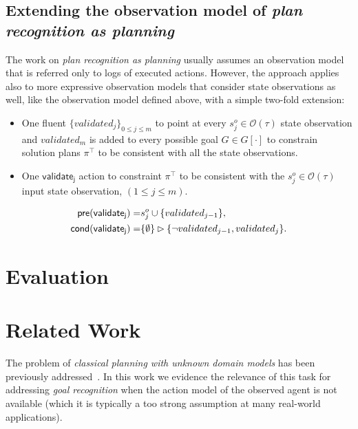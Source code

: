 \documentclass{article}
\newcommand{\pre}{\mathsf{pre}}     %
\newcommand{\cond}{\mathsf{cond}}   %
\begin{document}
\subsection{Extending the observation model of {\em plan recognition as planning}}
The work on {\em plan recognition as planning} usually assumes an observation model that is referred only to logs of executed actions. However, the approach applies also to more expressive observation models that consider state observations as well, like the observation model defined above, with a simple two-fold extension:
\begin{itemize}
\item One fluent $\{validated_j\}_{0\leq j\leq m}$ to point at every $s_j^o\in\mathcal{O}(\tau)$ state observation and $validated_m$ is added to every possible goal $G\in G[\cdot]$ to constrain solution plans $\pi^\top$ to be consistent with all the state observations.
\item One $\mathsf{validate_{j}}$ action to constraint $\pi^\top$ to be consistent with the $s_j^o\in\mathcal{O}(\tau)$ input state observation, {\small $(1\leq j\leq m)$}.  
\end{itemize}
\begin{small}
\begin{align*}
\hspace*{7pt}\pre(\mathsf{validate_{j}})=&s_j^o\cup\{validated_{j-1}\},\\
\cond(\mathsf{validate_{j}})=&\{\emptyset\}\rhd\{\neg validated_{j-1}, validated_j\}.
\end{align*}
\end{small}



\section{Evaluation}
\label{sec:evaluation}

\section{Related Work}
\label{sec:evaluation}
The problem of {\em classical planning with unknown domain models} has been previously addressed~\cite{SternJ17}. In this work we evidence the relevance of this task for addressing {\em goal recognition} when the action model of the observed agent is not available (which it is typically a too strong assumption at many real-world applications).   
\end{document}
